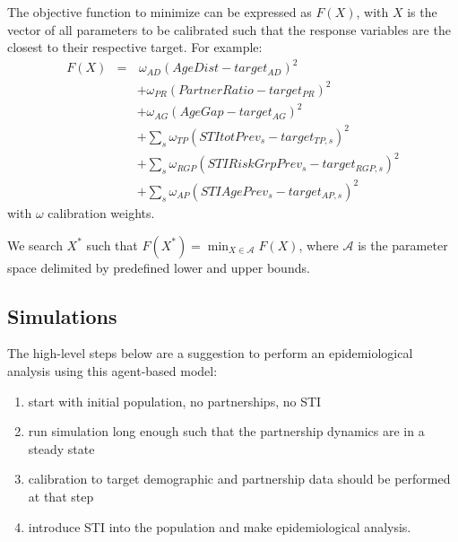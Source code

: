 \documentclass[11pt, onecolumn]{article}
\begin{document}
The objective function to minimize can be expressed as $F(X)$, with $X$ is the vector of all parameters to be calibrated such that the response variables are the closest to their respective target. For example:
\begin{eqnarray*}
F(X) & =&\,\omega_{AD}(AgeDist - target_{AD})^2 \\
& & + \omega_{PR}(PartnerRatio - target_{PR})^2 \\
& & + \omega_{AG}(AgeGap - target_{AG})^2 \\
& & +\sum_s \omega_{TP}(STItotPrev_s-target_{TP,s})^2 \\
& & +\sum_s \omega_{RGP}(STIRiskGrpPrev_s-target_{RGP,s})^2\\
& & +\sum_s \omega_{AP}(STIAgePrev_s-target_{AP,s})^2
\end{eqnarray*}
with $\omega$ calibration weights. 

We search $X^*$ such that $F(X^*)=\min_{X\in \mathcal{A}} F(X)$, where $\mathcal{A}$ is the parameter space delimited by predefined lower and upper bounds.


\subsection{Simulations}

The high-level steps below are a suggestion to perform an epidemiological analysis using this agent-based model:

\begin{enumerate}
\item start with initial population, no partnerships, no STI
\item run simulation long enough such that the partnership dynamics are in a steady state
\item calibration to target demographic and partnership data should be performed at that step
\item introduce STI into the population and make epidemiological analysis.
\end{enumerate}


\newpage


\end{document}
